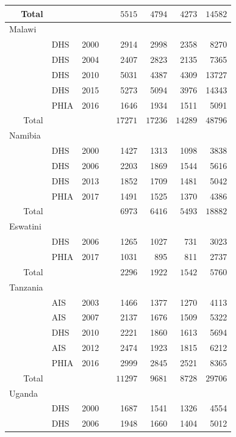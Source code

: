 \documentclass[a4paper, nobind]{templates/ociamthesis}
\newcommand{\cmark}{\ding{51}}
\newcommand{\xmark}{\ding{55}}
\begin{document}
\begin{longtable}{rlrcrrrr}
Total &  &  &  & $5515$ & $4794$ & $4273$ & $14582$ \\ 
\midrule
\multicolumn{1}{l}{Malawi} \\ 
\midrule
 & DHS & 2000 & \xmark & 2914 & 2998 & 2358 & 8270 \\ 
 & DHS & 2004 & \xmark & 2407 & 2823 & 2135 & 7365 \\ 
 & DHS & 2010 & \xmark & 5031 & 4387 & 4309 & 13727 \\ 
 & DHS & 2015 & \cmark & 5273 & 5094 & 3976 & 14343 \\ 
 & PHIA & 2016 & \cmark & 1646 & 1934 & 1511 & 5091 \\ 
Total &  &  &  & $17271$ & $17236$ & $14289$ & $48796$ \\ 
\midrule
\multicolumn{1}{l}{Namibia} \\ 
\midrule
 & DHS & 2000 & \xmark & 1427 & 1313 & 1098 & 3838 \\ 
 & DHS & 2006 & \xmark & 2203 & 1869 & 1544 & 5616 \\ 
 & DHS & 2013 & \xmark & 1852 & 1709 & 1481 & 5042 \\ 
 & PHIA & 2017 & \cmark & 1491 & 1525 & 1370 & 4386 \\ 
Total &  &  &  & $6973$ & $6416$ & $5493$ & $18882$ \\ 
\midrule
\multicolumn{1}{l}{Eswatini} \\ 
\midrule
 & DHS & 2006 & \xmark & 1265 & 1027 & 731 & 3023 \\ 
 & PHIA & 2017 & \xmark & 1031 & 895 & 811 & 2737 \\ 
Total &  &  &  & $2296$ & $1922$ & $1542$ & $5760$ \\ 
\midrule
\multicolumn{1}{l}{Tanzania} \\ 
\midrule
 & AIS & 2003 & \xmark & 1466 & 1377 & 1270 & 4113 \\ 
 & AIS & 2007 & \xmark & 2137 & 1676 & 1509 & 5322 \\ 
 & DHS & 2010 & \xmark & 2221 & 1860 & 1613 & 5694 \\ 
 & AIS & 2012 & \xmark & 2474 & 1923 & 1815 & 6212 \\ 
 & PHIA & 2016 & \cmark & 2999 & 2845 & 2521 & 8365 \\ 
Total &  &  &  & $11297$ & $9681$ & $8728$ & $29706$ \\ 
\midrule
\multicolumn{1}{l}{Uganda} \\ 
\midrule
 & DHS & 2000 & \xmark & 1687 & 1541 & 1326 & 4554 \\ 
 & DHS & 2006 & \xmark & 1948 & 1660 & 1404 & 5012 \\ 

\end{longtable}
\end{document}
